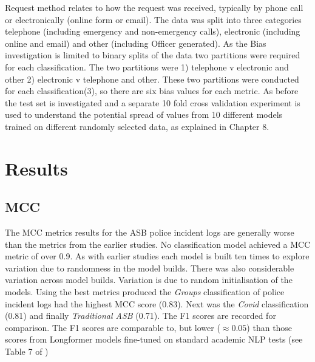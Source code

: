Request method relates to how the request was received, typically by phone call or electronically (online form or email). The data was split into three categories telephone (including emergency and non-emergency calls), electronic (including online and email) and other (including  Officer generated). As the Bias investigation is limited to binary splits of the data two partitions were required for each classification. The two partitions were 1) telephone v electronic and other 2) electronic v telephone and other. These two partitions were conducted for each classification(3), so there are six bias values for each metric. As before the test set is investigated and a separate 10 fold cross validation experiment is used to understand the potential spread of values from 10 different models trained on different randomly selected data, as explained in Chapter 8.

 

\section{Results}

\subsection{MCC} The MCC metrics results for the ASB police incident logs are generally worse than the metrics from the earlier studies. No classification model achieved a MCC metric of over 0.9. As with earlier studies each model is built ten times to explore variation due to randomness in the model builds. There was also considerable variation across model builds. Variation is due to random initialisation of the models. Using the best metrics produced the \emph{Groups} classification of police incident logs had the highest MCC score (0.83). Next was the \emph{Covid} classification (0.81) and finally \emph{Traditional ASB} (0.71). The F1 scores are recorded for comparison. The F1 scores are comparable to, but lower ($\approx 0.05$) than those scores from Longformer models fine-tuned on standard academic NLP tests (see Table 7 of \textcite{beltagy2020longformer}) 

